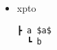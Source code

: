 \documentclass[
a4paper,
]{article}
\makeatletter
\def\autogobble{\fpeval{2(\@itemdepth+\@enumdepth)}}
\makeatother
\begin{document}
\begin{itemize}
\item xpto
  \begin{Verbatim}[commandchars=\\\{\}, mathescape, gobble=\autogobble]
  ┣ a $a$
  ┗ b
  \end{Verbatim}
\end{itemize}
\end{document}
